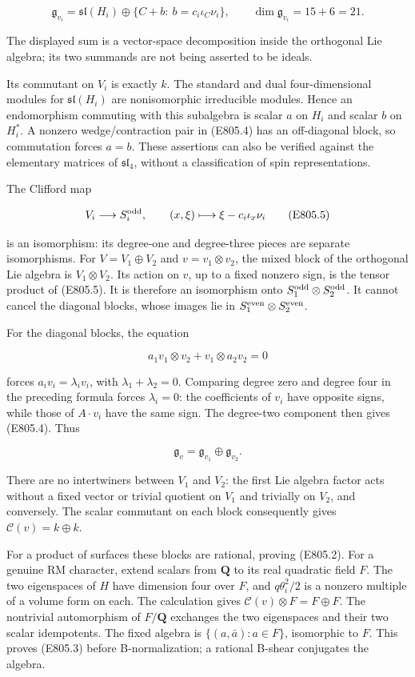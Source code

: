 \[
 \mathfrak g_{v_i}
 =\mathfrak{sl}(H_i)\oplus
  \{C+b:\ b=c_i\iota_C\nu_i\},\qquad
 \dim\mathfrak g_{v_i}=15+6=21.
 \tag{E805.4}
\]

The displayed sum is a vector-space decomposition inside the orthogonal
Lie algebra; its two summands are not being asserted to be ideals.

Its commutant on \(V_i\) is exactly \(k\). The standard and dual
four-dimensional modules for \(\mathfrak{sl}(H_i)\) are nonisomorphic
irreducible modules. Hence an endomorphism commuting with this
subalgebra is scalar \(a\) on \(H_i\) and scalar \(b\) on \(H_i^*\). A
nonzero wedge/contraction pair in (E805.4) has an off-diagonal block, so
commutation forces \(a=b\). These assertions can also be verified
against the elementary matrices of \(\mathfrak{sl}_4\), without a
classification of spin representations.

The Clifford map

\[
 V_i\longrightarrow S_i^{\rm odd},\qquad
 (x,\xi)\longmapsto\xi-c_i\iota_x\nu_i
 \tag{E805.5}
\]

is an isomorphism: its degree-one and degree-three pieces are separate
isomorphisms. For \(V=V_1\oplus V_2\) and \(v=v_1\otimes v_2\), the
mixed block of the orthogonal Lie algebra is \(V_1\otimes V_2\). Its
action on \(v\), up to a fixed nonzero sign, is the tensor product of
(E805.5). It is therefore an isomorphism onto
\(S_1^{\rm odd}\otimes S_2^{\rm odd}\). It cannot cancel the diagonal
blocks, whose images lie in \(S_1^{\rm even}\otimes S_2^{\rm even}\).

For the diagonal blocks, the equation

\[
 a_1v_1\otimes v_2+v_1\otimes a_2v_2=0
\]

forces \(a_iv_i=\lambda_i v_i\), with \(\lambda_1+\lambda_2=0\).
Comparing degree zero and degree four in the preceding formula forces
\(\lambda_i=0\): the coefficients of \(v_i\) have opposite signs, while
those of \(A\cdot v_i\) have the same sign. The degree-two component
then gives (E805.4). Thus

\[
 \mathfrak g_v=\mathfrak g_{v_1}\oplus\mathfrak g_{v_2}.
 \tag{E805.6}
\]

There are no intertwiners between \(V_1\) and \(V_2\): the first Lie
algebra factor acts without a fixed vector or trivial quotient on
\(V_1\) and trivially on \(V_2\), and conversely. The scalar commutant
on each block consequently gives \(\mathcal C(v)=k\oplus k\).

For a product of surfaces these blocks are rational, proving (E805.2).
For a genuine RM character, extend scalars from \(\mathbf Q\) to its
real quadratic field \(F\). The two eigenspaces of \(H\) have dimension
four over \(F\), and \(q\theta_i^2/2\) is a nonzero multiple of a volume
form on each. The calculation gives
\(\mathcal C(v)\otimes F=F\oplus F\). The nontrivial automorphism of
\(F/\mathbf Q\) exchanges the two eigenspaces and their two scalar
idempotents. The fixed algebra is \(\{(a,\bar a):a\in F\}\), isomorphic
to \(F\). This proves (E805.3) before B-normalization; a rational
B-shear conjugates the algebra.

